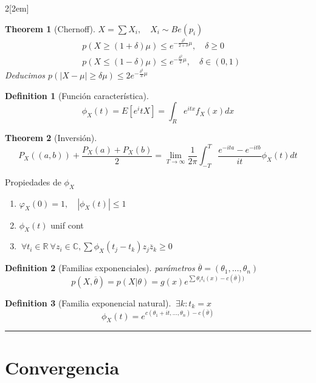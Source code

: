 \documentclass{myclass}
\newtheorem*{theorem}{Theorem}
\newtheorem*{definition}{Definition}
\begin{document}
\begin{multicols}{2}[\columnsep2em]
\begin{theorem}[Chernoff] $X=\sum X_i, \quad X_i \sim Be(p_i)$
\begin{align*}
  & p(X\ge (1+\delta)\mu) \le e^{- \frac{\delta^2}{2 + \delta}\mu}, \quad \delta\ge 0\\
  & p(X\le (1-\delta)\mu) \le e^{- \frac{\delta^2}{2 }\mu}, \quad \delta\in (0, 1)
\end{align*}
Deducimos $p(|X-\mu|\ge \delta\mu) \le 2e^{- \frac{\delta^2}{3}\mu}$
\end{theorem}

\begin{definition}[Función característica]
\[
\phi _X(t) = E[e^itX] = \int_{R} e^{itx}f_X(x)dx
\] 
\end{definition}

\begin{theorem}[Inversión]
 \[
P_X((a,b))+\frac{P_X(a) + P_X(b)}{2} = \lim_{T\to \infty } \frac{1}{2\pi} \int^T_{-T} \frac{e^{-ita}-e^{-itb}}{it} \phi_X(t)dt
\] 
\end{theorem}

Propiedades de $\phi_X$
\begin{enumerate}[topsep=-6pt, itemsep=0pt]
  \item $\varphi_X(0) = 1, \quad |\phi_X(t)|\le 1$ 
  \item $\phi _X(t)$ unif cont
  \item $\ \forall t_i\in \mathbb{R}\ \forall z_i\in \mathbb{C}, \sum \phi_X(t_j-t_k)z_j \overline{z}_k \ge 0$
\end{enumerate}

\begin{definition}[Familias exponenciales] parámetros $\overline{\theta }=(\theta _1, \ldots, \theta _n)$
\[
p(X, \overline{\theta }) = p(X|\theta ) = g(x)e^{\sum \theta_it_i(x) - c(\overline{\theta }))}
\] 
\end{definition}

\begin{definition}[Familia exponencial natural] $\ \exists k: t_k = x$ 
\[
\phi _X(t) = e^{c(\theta_1+it, \ldots, \theta _n)-c(\overline{\theta })}
\] 
\end{definition}
\hrule
\section{Convergencia}


\end{multicols}
\end{document}
